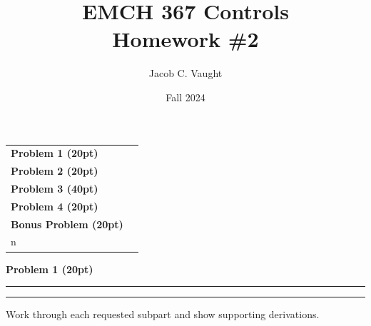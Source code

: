 \documentclass[12pt]{article}
\title{EMCH 367 Controls \\ Homework \#2}
\author{Jacob C. Vaught}
\date{Fall 2024}
\newcommand{\question}[1]{%
  \clearpage
  \vspace{0.5cm}
  {\noindent\normalsize \textbf{#1}}
  \vspace{0.2cm}
  \hrule
  \vspace{0.1cm}
  \hrule
  \vspace{0.3cm}
}
\begin{document}
\maketitle
\setlength{\parindent}{0pt}

\begin{center}
\begin{tcolorbox}[colback=white, colframe=gray!50!black, colbacktitle=gray!20!white,
                  coltitle=black, sharp corners, boxrule=1pt,
                  title=\Large\bfseries Table of Contents]
\begin{tabular}{p{}r}
\textbf{Problem 1 (20pt)} \dotfill & \textbf{\pageref{quest:1}} \\[0.3em]
\textbf{Problem 2 (20pt)} \dotfill & \textbf{\pageref{quest:2}} \\[0.3em]
\textbf{Problem 3 (40pt)} \dotfill & \textbf{\pageref{quest:3}} \\[0.3em]
\textbf{Problem 4 (20pt)} \dotfill & \textbf{\pageref{quest:4}} \\[0.3em]
\textbf{Bonus Problem (20pt)} \dotfill & \textbf{\pageref{quest:5}} \\n\end{tabular}
\vspace{0.2cm}
\end{tcolorbox}
\end{center}


\question{Problem 1 (20pt)}\label{quest:1}
\begin{stepbox}
Work through each requested subpart and show supporting derivations.
\end{stepbox}
\end{document}
